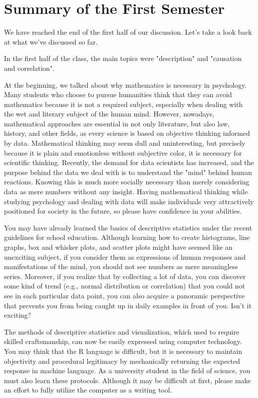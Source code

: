 \documentclass{ltjbook}
\begin{document}
\chapter{Summary of the First Semester}
\label{chapter15}
We have reached the end of the first half of our discussion. Let's take a look back at what we've discussed so far.

In the first half of the class, the main topics were "description" and "causation and correlation".

At the beginning, we talked about why mathematics is necessary in psychology. Many students who choose to pursue humanities think that they can avoid mathematics because it is not a required subject, especially when dealing with the wet and literary subject of the human mind. However, nowadays, mathematical approaches are essential in not only literature, but also law, history, and other fields, as every science is based on objective thinking informed by data. Mathematical thinking may seem dull and uninteresting, but precisely because it is plain and emotionless without subjective color, it is necessary for scientific thinking. Recently, the demand for data scientists has increased, and the purpose behind the data we deal with is to understand the "mind" behind human reactions. Knowing this is much more socially necessary than merely considering data as mere numbers without any insight. Having mathematical thinking while studying psychology and dealing with data will make individuals very attractively positioned for society in the future, so please have confidence in your abilities.

You may have already learned the basics of descriptive statistics under the recent guidelines for school education. Although learning how to create histograms, line graphs, box and whisker plots, and scatter plots might have seemed like an unexciting subject, if you consider them as expressions of human responses and manifestations of the mind, you should not see numbers as mere meaningless series. Moreover, if you realize that by collecting a lot of data, you can discover some kind of trend (e.g., normal distribution or correlation) that you could not see in each particular data point, you can also acquire a panoramic perspective that prevents you from being caught up in daily examples in front of you. Isn't it exciting?

The methods of descriptive statistics and visualization, which used to require skilled craftsmanship, can now be easily expressed using computer technology. You may think that the R language is difficult, but it is necessary to maintain objectivity and procedural legitimacy by mechanically returning the expected response in machine language. As a university student in the field of science, you must also learn these protocols. Although it may be difficult at first, please make an effort to fully utilize the computer as a writing tool.
\end{document}
